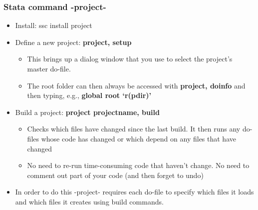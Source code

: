 \documentclass{beamer}
\begin{document}
\frame
{
	\frametitle{Stata command -project-}
	
	\begin{itemize}
		\item Install: ssc install project
	\vspace{0.2cm}
		\item Define a new project: \textbf{project, setup}
		\begin{itemize}
			\item This brings up a dialog window that you use to select the project's master do-file.
			\item The root folder can then always be accessed with \textbf{project, doinfo} and then typing, e.g., \textbf{global root `r(pdir)'}
		\end{itemize}	\vspace{0.2cm}
		\item Build a project: \textbf{project  projectname, build}
		\begin{itemize}
			\item Checks which files have changed since the last build. It then runs any do-files whose code has changed or which depend on any files that have changed
			\item No need to re-run time-consuming code that haven't change. No need to comment out part of your code (and then forget to undo)
		\end{itemize}
		\vspace{0.2cm}
	\item 	In order to do this -project- requires each do-file to specify which files it loads and which files it creates using build commands.
	\end{itemize}	
	
}
\end{document}
